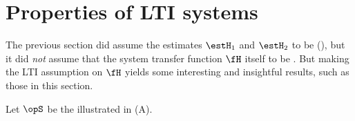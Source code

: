 \section{Properties of LTI systems}
The previous section did assume the estimates $\estH_1$ and $\estH_2$  to be 
 (), but it did \emph{not} assume that 
the system transfer function $\fH$ itself to be . 
But making the LTI assumption on $\fH$ yields some interesting and insightful
results, such as those in this section.

\begin{theorem}
\label{thm:estH1_cnoise}
\label{thm:estH2_cnoise}
Let $\opS$ be the  illustrated in  (A).
\end{theorem}
